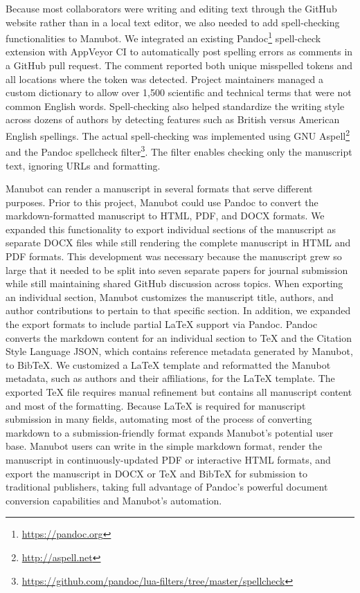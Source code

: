 \documentclass[twocolumn]{ceurart}
\begin{document}
Because most collaborators were writing and editing text through the GitHub website rather than in a local text editor, we also needed to add spell-checking functionalities to Manubot.
We integrated an existing Pandoc\footnote{\url{https://pandoc.org}} spell-check extension with AppVeyor CI to automatically post spelling errors as comments in a GitHub pull request.
The comment reported both unique misspelled tokens and all locations where the token was detected.
Project maintainers managed a custom dictionary to allow over 1,500 scientific and technical terms that were not common English words.
Spell-checking also helped standardize the writing style across dozens of authors by detecting features such as British versus American English spellings.
The actual spell-checking was implemented using GNU Aspell\footnote{\url{http://aspell.net}} and the Pandoc spellcheck filter\footnote{\url{https://github.com/pandoc/lua-filters/tree/master/spellcheck}}.
The filter enables checking only the manuscript text, ignoring URLs and formatting.

Manubot can render a manuscript in several formats that serve different purposes.
Prior to this project, Manubot could use Pandoc to convert the markdown-formatted manuscript to HTML, PDF, and DOCX formats.
We expanded this functionality to export individual sections of the manuscript as separate DOCX files while still rendering the complete manuscript in HTML and PDF formats.
This development was necessary because the manuscript grew so large that it needed to be split into seven separate papers for journal submission while still maintaining shared GitHub discussion across topics.
When exporting an individual section, Manubot customizes the manuscript title, authors, and author contributions to pertain to that specific section.
In addition, we expanded the export formats to include partial LaTeX support via Pandoc.
Pandoc converts the markdown content for an individual section to TeX and the Citation Style Language JSON, which contains reference metadata generated by Manubot, to BibTeX.
We customized a LaTeX template and reformatted the Manubot metadata, such as authors and their affiliations, for the LaTeX template.
The exported TeX file requires manual refinement but contains all manuscript content and most of the formatting.
Because LaTeX is required for manuscript submission in many fields, automating most of the process of converting markdown to a submission-friendly format expands Manubot's potential user base.
Manubot users can write in the simple markdown format, render the manuscript in continuously-updated PDF or interactive HTML formats, and export the manuscript in DOCX or TeX and BibTeX for submission to traditional publishers, taking full advantage of Pandoc's powerful document conversion capabilities and Manubot's automation.
\end{document}
